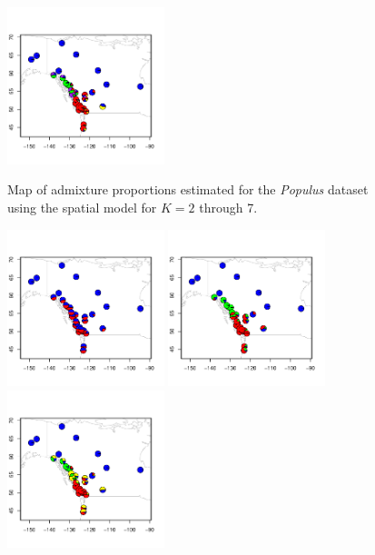 \documentclass[12pt]{article}
\begin{document}
\begin{figure}
			{\includegraphics[width=1.8in,height=1.8in]{figs/populus/populus_sp7.pdf}}
	\caption{
	Map of admixture proportions estimated for the \textit{Populus} dataset 
	using the spatial model for $K=2$ through 7.
    }\label{populus_sp_pies}
\end{figure}

\begin{figure}
	\centering
			{\includegraphics[width=1.8in,height=1.8in]{figs/populus/populus_nsp2.pdf}}
			{\includegraphics[width=1.8in,height=1.8in]{figs/populus/populus_nsp3.pdf}}
			{\includegraphics[width=1.8in,height=1.8in]{figs/populus/populus_nsp4.pdf}}

\end{figure}
\end{document}

